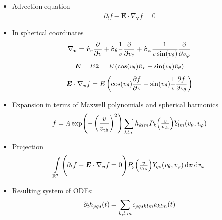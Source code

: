 \documentclass[mathserif, aspectratio=169]{beamer}
\newcommand{\ud}{\,\mathrm{d}}
\newcommand{\vect}[1]{\boldsymbol{#1}}
\newcommand{\of}[1]{\mleft( #1 \mright)}
\newcommand{\vth}{v_{\textrm{th}}}
\newcommand{\reals}{\mathbb{R}}
\newcommand{\myint}{\int\limits}
\newcommand{\vr}{v}
\newcommand{\vtheta}{v_{\theta}}
\newcommand{\vphi}{v_{\varphi}}
\newcommand{\vomega}{v_{\omega}}
\newcommand{\vrunit}{\hat{\vect{v}}_{r}}
\newcommand{\vthetaunit}{\hat{\vect{v}}_{\theta}}
\newcommand{\vphiunit}{\hat{\vect{v}}_{\varphi}}
\begin{document}
\begin{frame}
\begin{itemize}
\item Advection equation
\begin{align*}
\partial_t f - \vect{E} \cdot \nabla_{\vect{v }}f = 0
\end{align*}
\item In spherical coordinates
\begin{align*}
\nabla_{\vect{v}} 
= \vrunit \frac{\partial}{\partial \vr}
+ \vthetaunit \frac{1}{\vr} \frac{\partial}{\partial \vtheta}
+ \vphiunit \frac{1}{\vr \sin\of{\vtheta}} \frac{\partial}{\partial \vphi}
\end{align*}
\begin{align*}
\vect{E} 
= E \hat{\vect{z}} 
= E \left( \cos\of{\vtheta} \vrunit - \sin\of{\vtheta} \vthetaunit \right)
\end{align*}
\begin{align*}
\vect{E}\cdot \nabla_{\vect{v}} f
= E 
\left( \cos\of{\vtheta} \frac{\partial f}{\partial \vr} 
- \sin\of{\vtheta} \frac{1}{\vr} \frac{\partial f}{\partial \vtheta} \right)
\end{align*}

\end{itemize}
%
\end{frame}

\begin{frame}

\begin{itemize}

\item Expansion in terms of Maxwell polynomials and spherical harmonics
\begin{align*}
f = A 
\exp\of{-\left(\frac{\vr}{\vth}\right)^2} 
\sum_{klm} h_{klm} P_k\of{\textstyle\frac{v}{\vth}} Y_{lm}\of{\vtheta,\vphi}
\end{align*}

\item  Projection:
\begin{align*}
\myint_{\reals^3} \Bigg( \partial_t f - \vect{E} \cdot \nabla_{\vect{v }}f = 0 \Bigg) P_p\of{\textstyle\frac{v}{\vth}} Y_{qs}\of{\vtheta,\vphi} \ud\vect{v} \ud\vomega
\end{align*}

\item Resulting system of ODEs:
\begin{align*}
\partial_t h_{pqs}\of{t} = \sum_{k,l,m}  \epsilon_{pqsklm} h_{klm}\of{t}
\end{align*}
\end{itemize}
%
\end{frame}
\end{document}

